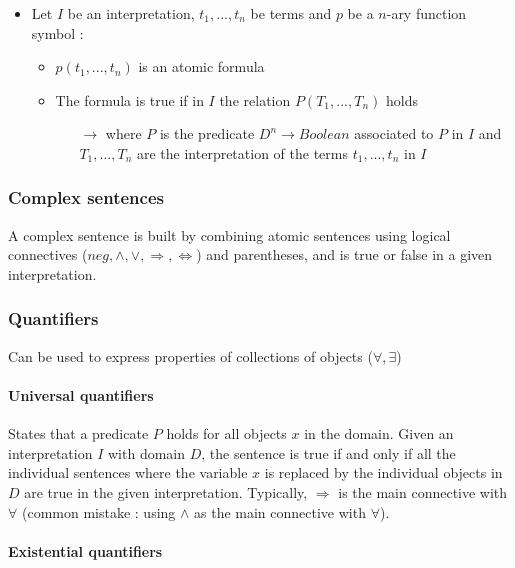\begin{itemize}
\item Let $I$ be an interpretation, $t_1, ..., t_n$ be terms and $p$ be a $n$-ary function symbol :
	\begin{itemize}
	\item $p(t_1, ..., t_n)$ is an atomic formula
	\item The formula is true if in $I$ the relation $P(T_1, ..., T_n)$ holds
		\begin{itemize}
		\item[$\rightarrow$] where $P$ is the predicate $D^n \rightarrow Boolean$ associated to $P$ in $I$ and $T_1, ..., T_n$ are the interpretation of the terms $t_1, ..., t_n$ in $I$
		\end{itemize}
	\end{itemize}
\end{itemize}

\subsubsection{Complex sentences}

A complex sentence is built by combining atomic sentences using logical connectives ($neg, \land, \lor, \Rightarrow, \Leftrightarrow$) and parentheses, and is true or false in a given interpretation.

\subsubsection{Quantifiers}

Can be used to express properties of collections of objects ($\forall, \exists$)

\paragraph{Universal quantifiers}

States that a predicate $P$ holds for all objects $x$ in the domain. Given an interpretation $I$ with domain $D$, the sentence is true if and only if all the individual sentences where the variable $x$ is replaced by the individual objects in $D$ are true in the given interpretation. Typically, $\Rightarrow$ is the main connective with $\forall$ (common mistake : using $\land$ as the main connective with $\forall$).

\paragraph{Existential quantifiers}

